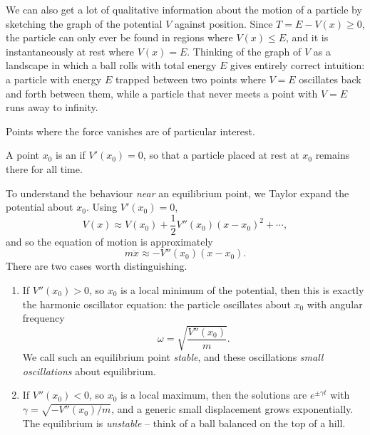 \documentclass[a4paper]{scrartcl}
\begin{document}
We can also get a lot of qualitative information about the motion of a particle by sketching the graph of the potential $V$ against position. Since $T = E - V(x) \geq 0$, the particle can only ever be found in regions where $V(x) \leq E$, and it is instantaneously at rest where $V(x) = E$. Thinking of the graph of $V$ as a landscape in which a ball rolls with total energy $E$ gives entirely correct intuition: a particle with energy $E$ trapped between two points where $V = E$ oscillates back and forth between them, while a particle that never meets a point with $V = E$ runs away to infinity.

\begin{center}
\end{center}

Points where the force vanishes are of particular interest.

\begin{definition}
	A point $x_0$ is an  if $V'(x_0) = 0$, so that a particle placed at rest at $x_0$ remains there for all time.
\end{definition}

To understand the behaviour \emph{near} an equilibrium point, we Taylor expand the potential about $x_0$. Using $V'(x_0) = 0$,
$$
V(x) \approx V(x_0) + \frac{1}{2}V''(x_0)(x - x_0)^2 + \cdots,
$$
and so the equation of motion is approximately
$$
m \ddot{x} \approx -V''(x_0) (x - x_0).
$$
There are two cases worth distinguishing.
\begin{enumerate}[label=(\roman*)]
	\item If $V''(x_0) > 0$, so $x_0$ is a local minimum of the potential, then this is exactly the harmonic oscillator equation: the particle oscillates about $x_0$ with angular frequency
	$$
	\omega = \sqrt{\frac{V''(x_0)}{m}}.
	$$
	We call such an equilibrium point \emph{stable}, and these oscillations \emph{small oscillations} about equilibrium.
	\item If $V''(x_0) < 0$, so $x_0$ is a local maximum, then the solutions are $e^{\pm \gamma t}$ with $\gamma = \sqrt{-V''(x_0)/m}$, and a generic small displacement grows exponentially. The equilibrium is \emph{unstable} -- think of a ball balanced on the top of a hill.
\end{enumerate}
\end{document}

